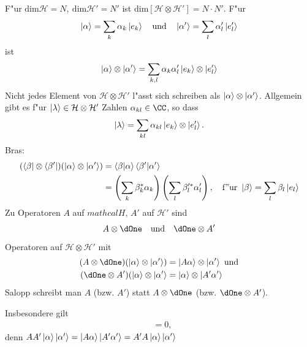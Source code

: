 \documentclass[a4paper]{scrartcl}
\begin{document}
{F"ur $\mathrm{dim} \mathcal H = N, \ \mathrm{dim} \mathcal H' = N'$ ist $\mathrm{dim} \left[ \mathcal H \otimes \mathcal H' \right] = N \cdot N'$. F"ur
$$\ket{\alpha} = \sum_k \alpha_k \ket{e_k} \quad \mathrm{und} \quad \ket{\alpha'} = \sum_l \alpha_l' \ket{e_l'}$$
ist
\begin{align}
\ket \alpha \otimes \ket{ \alpha'} = \sum_{k,l} \alpha_k \alpha_l' \ket{e_k} \otimes \ket{e_l'}
\end{align}
Nicht jedes Element von $\mathcal H \otimes \mathcal H'$ l"asst sich schreiben als $\ket \alpha \otimes \ket{\alpha'}$. Allgemein gibt es f"ur $\ket \lambda \in \mathcal H \otimes \mathcal H'$ Zahlen $\alpha_{kl} \in \CC$, so dass
\begin{align}
\ket \lambda = \sum_{kl} \alpha_{kl} \ket{e_k} \otimes \ket{e_l'}.
\end{align}
Bras:
\begin{align}
\begin{split}
( \bra \beta \otimes \bra{\beta'})(\ket \alpha \otimes \ket{\alpha'}) & = \braket{ \beta | \alpha} \braket{ \beta' | \alpha'} \\
& = \left( \sum_k \beta_k^* \alpha_k \right) \left( \sum_l \beta_l'^* \alpha_l' \right), \quad \mathrm{f"ur \ } \ket \beta = \sum_l \beta_l \ket{e_l}
\end{split}
\end{align}
Zu Operatoren $A$ auf $mathcal H$, $A'$ auf $\mathcal H'$ sind 
$$A \otimes \dOne \quad \mathrm{und} \quad \dOne \otimes A'$$
Operatoren auf $\mathcal H \otimes \mathcal H'$ mit
\begin{align}
\begin{split}
(A \otimes \dOne)( \ket \alpha \otimes \ket{\alpha'}) & = \ket{A \alpha} \otimes \ket{\alpha'} \ \mathrm{und} \\
( \dOne \otimes A')(\ket \alpha \otimes \ket{\alpha'} & = \ket \alpha \otimes \ket{ A' \alpha'}
\end{split}
\end{align}
Salopp schreibt man $A$ (bzw. $A'$) statt $A \otimes \dOne$ (bzw. $\dOne \otimes A'$). 

Insbesondere gilt
\begin{align} [ A, A'] & = 0, \end{align}
denn $A A' \ket \alpha \ket{\alpha'} = \ket{ A \alpha }\ket{ A' \alpha'} = A'A \ket \alpha \ket{\alpha'}$

}
\end{document}
